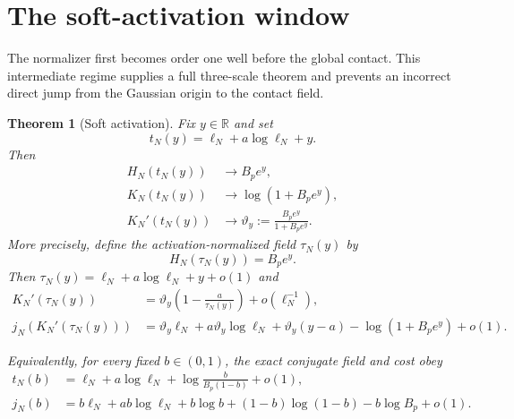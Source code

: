 \documentclass[11pt]{article}
\newtheorem{theorem}{Theorem}[section]
\newcommand{\R}{\mathbb R}
\begin{document}
\section{The soft-activation window}

The normalizer first becomes order one well before the global contact.
This intermediate regime supplies a full three-scale theorem and prevents
an incorrect direct jump from the Gaussian origin to the contact field.

\begin{theorem}[Soft activation]
\label{thm:soft}
Fix $y\in\R$ and set
\[
 t_N(y)=\ell_N+a\log\ell_N+y.
\]
Then
\begin{align}
 H_N(t_N(y))&\longrightarrow B_pe^y,\\
 K_N(t_N(y))&\longrightarrow\log(1+B_pe^y),\\
 K_N'(t_N(y))&\longrightarrow
 \vartheta_y:=\frac{B_pe^y}{1+B_pe^y}.                  \label{eq:theta}
\end{align}
More precisely, define the activation-normalized field $\tau_N(y)$ by
\[
 H_N(\tau_N(y))=B_pe^y.                                  \label{eq:exactactivation}
\]
Then $\tau_N(y)=\ell_N+a\log\ell_N+y+o(1)$ and
\begin{align}
 K_N'(\tau_N(y))
 &=\vartheta_y\left(1-\frac{a}{\tau_N(y)}\right)
   +o(\ell_N^{-1}),                                      \label{eq:softb}\\
 j_N(K_N'(\tau_N(y)))
 &=\vartheta_y\ell_N+a\vartheta_y\log\ell_N
 +\vartheta_y(y-a)-\log(1+B_pe^y)+o(1).                 \label{eq:softj}
\end{align}

Equivalently, for every fixed $b\in(0,1)$, the exact conjugate field and
cost obey
\begin{align}
 t_N(b)&=\ell_N+a\log\ell_N
 +\log\frac{b}{B_p(1-b)}+o(1),                          \label{eq:fixedbt}\\
 j_N(b)&=b\ell_N+ab\log\ell_N
 +b\log b+(1-b)\log(1-b)-b\log B_p+o(1).               \label{eq:fixedbj}
\end{align}
\end{theorem}
\end{document}
